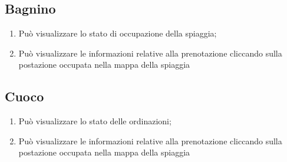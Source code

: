 \documentclass{article}
\begin{document}
\subsection{Bagnino}
\begin{enumerate}
	\item Può visualizzare lo stato di occupazione della spiaggia;
	\item Può visualizzare le informazioni relative alla prenotazione cliccando sulla postazione occupata nella mappa della spiaggia 
\end{enumerate}

\subsection{Cuoco}
\begin{enumerate}
	\item Può visualizzare lo stato delle ordinazioni;
		
	\item Può visualizzare le informazioni relative alla prenotazione cliccando sulla postazione occupata nella mappa della spiaggia 
\end{enumerate}

	
\end{document}
